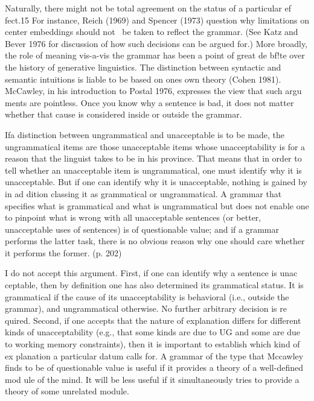 \clearpage\setcounter{page}{1}\begin{styleStandard}
Naturally, there might not be total agreement on the status of a particular ef\- fect.15 For instance, Reich (1969) and Spencer (1973) question why limitations on center embeddings should not \ be taken to reflect the grammar. (See Katz and Bever 1976 for discussion of how such decisions can be argued for.) More broadly, the role of meaning vis-a-vis the grammar has been a point of great de\- bf!te over the history of generative linguistics. The distinction between syntactic and semantic intuitions is liable to be based on one{\textquotesingle}s own theory (Cohen 1981). McCawley, in his introduction to Postal 1976, expresses the view that such argu\- ments are pointless. Once you know why a sentence is bad, it does not matter whether that cause is considered inside or outside the grammar.
\end{styleStandard}


\begin{styleStandard}
Ifa distinction between {\textquotedbl}ungrammatical{\textquotedbl} and {\textquotedbl}unacceptable{\textquotedbl} is to be made, the ungrammatical items are those unacceptable items whose unacceptability is for a reason that the linguist takes to be in his province. That means that in order to tell whether an unacceptable item is ungrammatical, one must identify why it is unacceptable. But if one can identify why it is unacceptable, nothing is gained by in ad\- dition classing it as grammatical or ungrammatical. A grammar that specifies what is grammatical and what is ungrammatical but does not enable one to pinpoint what is wrong with all unacceptable sentences (or better, unacceptable uses of sentences) is of questionable value; and if a grammar performs the latter task, there is no obvious reason why one should care whether it performs the former. (p. 202)
\end{styleStandard}


\begin{styleStandard}
I do not accept this argument. First, if one can identify why a sentence is unac\- ceptable, then by{\textquotesingle} definition one has also determined its grammatical status. It is grammatical if the cause of its unacceptability is behavioral (i.e., outside the grammar), and ungrammatical otherwise. No further arbitrary decision is re\- quired. Second, if one accepts that the nature of explanation differs for different kinds of unacceptability (e.g., that some kinds are due to UG and some are due to working memory constraints), then it is important to establish which kind of ex\- planation a particular datum calls for. A grammar of the type that Mccawley finds to be of questionable value is useful if it provides a theory of a well-defined mod\- ule of the mind. It will be less useful if it simultaneously tries to provide a theory of some unrelated module.
\end{styleStandard}


